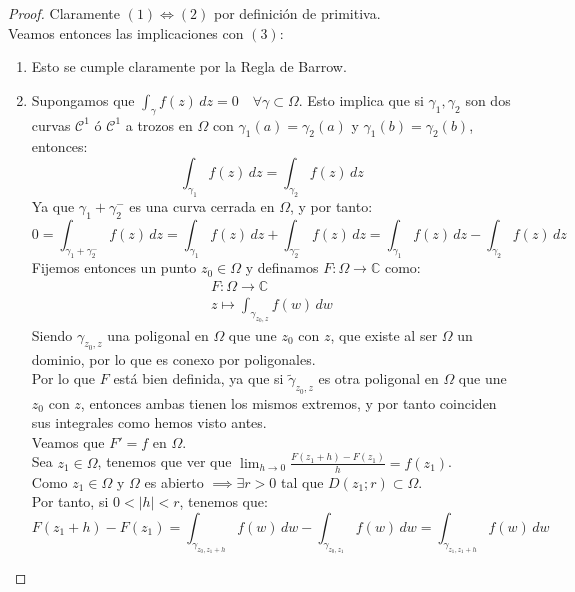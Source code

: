 \begin{proof}
    Claramente $(1) \Leftrightarrow (2)$ por definición de primitiva.\\
    Veamos entonces las implicaciones con $(3)$:
    \begin{enumerate}
        \item[$(1) \implies (3)$] Esto se cumple claramente por la Regla de Barrow.
        \item[$(1) \impliedby (3)$] Supongamos que $\int_{\gamma} f(z) \, dz = 0 \quad \forall \gamma \subset \Omega$. Esto implica que si $\gamma_1, \gamma_2$ son dos curvas $\mathcal{C}^1$ ó $\mathcal{C}^1$ a trozos en $\Omega$ con $\gamma_1(a) = \gamma_2(a)$ y $\gamma_1(b) = \gamma_2(b)$, entonces:
        \[
            \int_{\gamma_1} f(z) \, dz = \int_{\gamma_2} f(z) \, dz
        \]
        Ya que $\gamma_1 + \gamma_2^-$ es una curva cerrada en $\Omega$, y por tanto:
        \[
            0 = \int_{\gamma_1 + \gamma_2^-} f(z) \, dz = 
            \int_{\gamma_1} f(z) \, dz + \int_{\gamma_2^-} f(z) \, dz = \int_{\gamma_1} f(z) \, dz - \int_{\gamma_2} f(z) \, dz
        \]
        Fijemos entonces un punto $z_0 \in \Omega$ y definamos $F: \Omega \to \mathbb{C}$ como:
        \[
            \begin{array}{l}
                F: \Omega \to \mathbb{C} \\
                z \mapsto \int_{\gamma_{z_0, z}} f(w) \, dw
            \end{array}
        \]
        Siendo $\gamma_{z_0, z}$ una poligonal en $\Omega$ que une $z_0$ con $z$, que existe al ser $\Omega$ un dominio, por lo que es conexo por poligonales.\\
        Por lo que $F$ está bien definida, ya que si $\tilde{\gamma}_{z_0, z}$ es otra poligonal en $\Omega$ que une $z_0$ con $z$, entonces ambas tienen los mismos extremos, y por tanto coinciden sus integrales como hemos visto antes.\\
        Veamos que $F'=f$ en $\Omega$.\\
        Sea $z_1 \in \Omega$, tenemos que ver que $\lim_{h \to 0} \frac{F(z_1 + h) - F(z_1)}{h} = f(z_1)$.\\
        Como $z_1 \in \Omega$ y $\Omega$ es abierto $\implies \exists r > 0$ tal que $D(z_1; r) \subset \Omega$.\\
        Por tanto, si $0 < |h| < r$, tenemos que:
        \[
        F(z_1 + h) - F(z_1) = 
        \int_{\gamma_{z_0, z_1 + h}} f(w) \, dw -
        \int_{\gamma_{z_0, z_1}} f(w) \, dw =
        \int_{\gamma_{z_1, z_1 + h}} f(w) \, dw
\]
\end{enumerate}
\end{proof}
